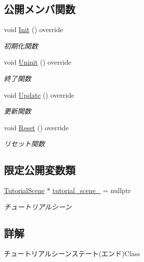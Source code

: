 \subsection*{公開メンバ関数}
\begin{DoxyCompactItemize}
\item 
void \mbox{\hyperlink{class_tutorial_scene_state___end_a572e5687140ff5ac43789f90462c05a5}{Init}} () override
\begin{DoxyCompactList}\small\item\em 初期化関数 \end{DoxyCompactList}\item 
void \mbox{\hyperlink{class_tutorial_scene_state___end_aafc0d8d042de8c7f79d84fcdc35a807c}{Uninit}} () override
\begin{DoxyCompactList}\small\item\em 終了関数 \end{DoxyCompactList}\item 
void \mbox{\hyperlink{class_tutorial_scene_state___end_a7cdf03fa9a0e41ab86c2b41b8165ad09}{Update}} () override
\begin{DoxyCompactList}\small\item\em 更新関数 \end{DoxyCompactList}\item 
void \mbox{\hyperlink{class_tutorial_scene_state___end_ada1a87235a021b40f8eca96e31879227}{Reset}} () override
\begin{DoxyCompactList}\small\item\em リセット関数 \end{DoxyCompactList}\end{DoxyCompactItemize}
\subsection*{限定公開変数類}
\begin{DoxyCompactItemize}
\item 
\mbox{\hyperlink{class_tutorial_scene}{Tutorial\+Scene}} $\ast$ \mbox{\hyperlink{class_tutorial_scene_state___end_a68f36e80b530182a5b5d835425b7e829}{tutorial\+\_\+scene\+\_\+}} = nullptr
\begin{DoxyCompactList}\small\item\em チュートリアルシーン \end{DoxyCompactList}\end{DoxyCompactItemize}


\subsection{詳解}
チュートリアルシーンステート(エンド)Class 

